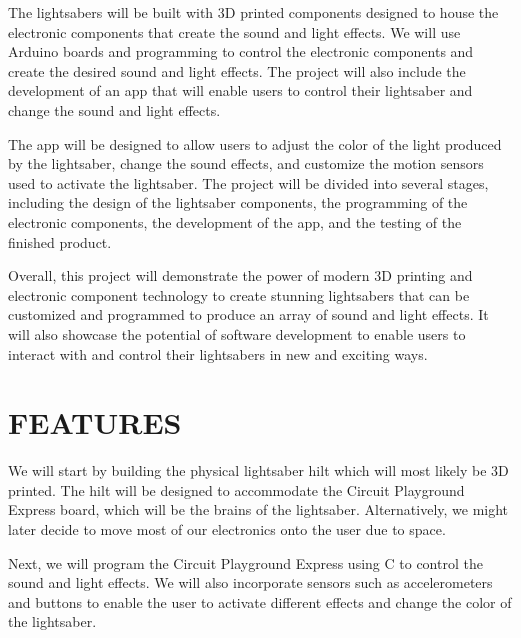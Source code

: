 \documentclass[12pt]{article}
\begin{document}
The lightsabers will be built with 3D printed components designed to house the electronic components that create the sound and light effects. We will use Arduino boards and programming to control the electronic components and create the desired sound and light effects. The project will also include the development of an app that will enable users to control their lightsaber and change the sound and light effects.

The app will be designed to allow users to adjust the color of the light produced by the lightsaber, change the sound effects, and customize the motion sensors used to activate the lightsaber. The project will be divided into several stages, including the design of the lightsaber components, the programming of the electronic components, the development of the app, and the testing of the finished product.

Overall, this project will demonstrate the power of modern 3D printing and electronic component technology to create stunning lightsabers that can be customized and programmed to produce an array of sound and light effects. It will also showcase the potential of software development to enable users to interact with and control their lightsabers in new and exciting ways.
\section{FEATURES}

We will start by building the physical lightsaber hilt which will most likely be 3D printed. The hilt will be designed to accommodate the Circuit Playground Express board, which will be the brains of the lightsaber. Alternatively, we might later decide to move most of our electronics onto the user due to space.

Next, we will program the Circuit Playground Express using C to control the sound and light effects. We will also incorporate sensors such as accelerometers and buttons to enable the user to activate different effects and change the color of the lightsaber.
\end{document}
